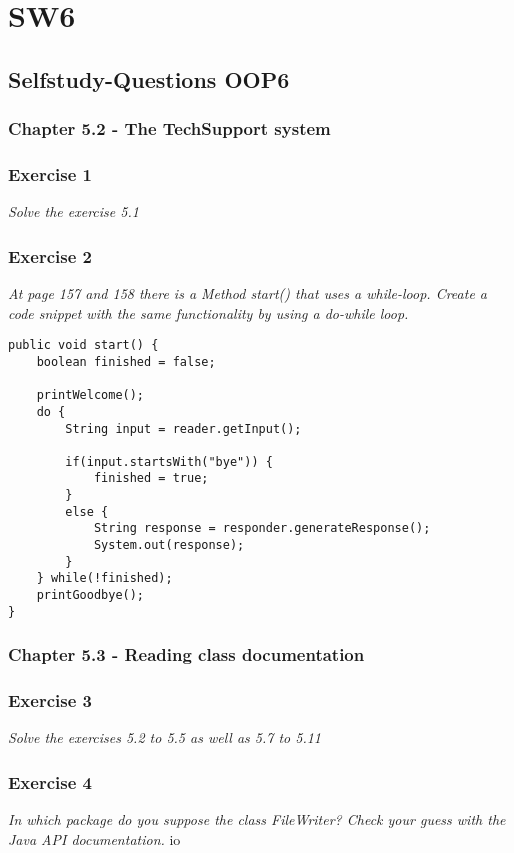\section{SW6}
\subsection{Selfstudy-Questions OOP6}

\subsubsection{Chapter 5.2 - The TechSupport system}

\subsubsection*{Exercise 1}
\textit{Solve the exercise 5.1}

\subsubsection*{Exercise 2}
\textit{At page 157 and 158 there is a Method start() that uses a 
while-loop. Create a code snippet with the same functionality by using a
do-while loop.}
\begin{lstlisting}
public void start() {
    boolean finished = false;
    
    printWelcome();
    do {
        String input = reader.getInput();
        
        if(input.startsWith("bye")) {
            finished = true;
        }
        else {
            String response = responder.generateResponse();
            System.out(response);
        }
    } while(!finished);
    printGoodbye();
}
\end{lstlisting}

\subsubsection{Chapter 5.3 - Reading class documentation}

\subsubsection*{Exercise 3}
\textit{Solve the exercises 5.2 to 5.5 as well as 5.7 to 5.11}

\subsubsection*{Exercise 4}
\textit{In which package do you suppose the class FileWriter?
Check your guess with the Java API documentation.}
io

